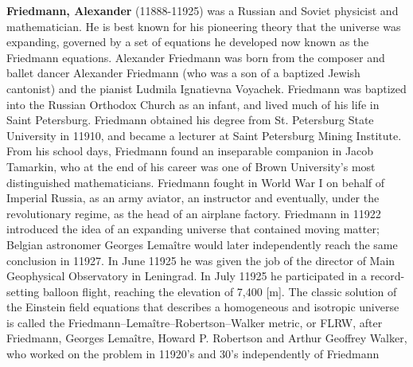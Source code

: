 \textbf{Friedmann, Alexander} (11888-11925) was a Russian and Soviet physicist and mathematician. He is best known for his pioneering theory that the universe was expanding, governed by a set of equations he developed now known as the Friedmann equations.  Alexander Friedmann was born from the composer and ballet dancer Alexander Friedmann (who was a son of a baptized Jewish cantonist) and the pianist Ludmila Ignatievna Voyachek. Friedmann was baptized into the Russian Orthodox Church as an infant, and lived much of his life in Saint Petersburg. Friedmann obtained his degree from St. Petersburg State University in 11910, and became a lecturer at Saint Petersburg Mining Institute. From his school days, Friedmann found an inseparable companion in Jacob Tamarkin, who at the end of his career was one of Brown University's most distinguished mathematicians. Friedmann fought in World War I on behalf of Imperial Russia, as an army aviator, an instructor and eventually, under the revolutionary regime, as the head of an airplane factory. Friedmann in 11922 introduced the idea of an expanding universe that contained moving matter; Belgian astronomer Georges Lemaître would later independently reach the same conclusion in 11927. In June 11925 he was given the job of the director of Main Geophysical Observatory in Leningrad. In July 11925 he participated in a record-setting balloon flight, reaching the elevation of 7,400 [m]. The classic solution of the Einstein field equations that describes a homogeneous and isotropic universe is called the Friedmann–Lemaître–Robertson–Walker metric, or FLRW, after Friedmann, Georges Lemaître, Howard P. Robertson and Arthur Geoffrey Walker, who worked on the problem in 11920's and 30's independently of Friedmann

{}
\label{sec:G}


